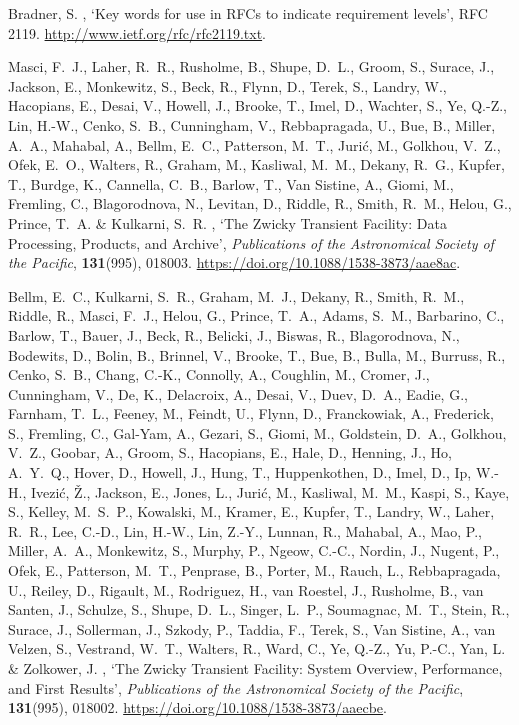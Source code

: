 \begin{thebibliography}{xx}

Bradner, S.  \harvardyearright , `Key words for use in
  {RFCs} to indicate requirement levels', RFC 2119.
\newblock \url{http://www.ietf.org/rfc/rfc2119.txt}.

Masci, F.~J., Laher, R.~R., Rusholme, B., Shupe, D.~L., Groom, S., Surace, J., Jackson, E., Monkewitz, S., Beck, R., Flynn, D., Terek, S., Landry, W., Hacopians, E., Desai, V., Howell, J., Brooke, T., Imel, D., Wachter, S., Ye, Q.-Z., Lin, H.-W., Cenko, S.~B., Cunningham, V., Rebbapragada, U., Bue, B., Miller, A.~A., Mahabal, A., Bellm, E.~C., Patterson, M.~T., Juri\'{c}, M., Golkhou, V.~Z., Ofek, E.~O., Walters, R., Graham, M., Kasliwal, M.~M., Dekany, R.~G., Kupfer, T., Burdge, K., Cannella, C.~B., Barlow, T., Van Sistine, A., Giomi, M., Fremling, C., Blagorodnova, N., Levitan, D., Riddle, R., Smith, R.~M., Helou, G., Prince, T.~A. \& Kulkarni, S.~R. \harvardyearright , `The Zwicky Transient Facility: Data Processing, Products, and Archive', \emph{Publications of the Astronomical Society of the Pacific}, \textbf{131}(995), 018003.
\newblock \url{https://doi.org/10.1088/1538-3873/aae8ac}.

Bellm, E.~C., Kulkarni, S.~R., Graham, M.~J., Dekany, R., Smith, R.~M., Riddle, R., Masci, F.~J., Helou, G., Prince, T.~A., Adams, S.~M., Barbarino, C., Barlow, T., Bauer, J., Beck, R., Belicki, J., Biswas, R., Blagorodnova, N., Bodewits, D., Bolin, B., Brinnel, V., Brooke, T., Bue, B., Bulla, M., Burruss, R., Cenko, S.~B., Chang, C.-K., Connolly, A., Coughlin, M., Cromer, J., Cunningham, V., De, K., Delacroix, A., Desai, V., Duev, D.~A., Eadie, G., Farnham, T.~L., Feeney, M., Feindt, U., Flynn, D., Franckowiak, A., Frederick, S., Fremling, C., Gal-Yam, A., Gezari, S., Giomi, M., Goldstein, D.~A., Golkhou, V.~Z., Goobar, A., Groom, S., Hacopians, E., Hale, D., Henning, J., Ho, A.~Y.~Q., Hover, D., Howell, J., Hung, T., Huppenkothen, D., Imel, D., Ip, W.-H., Ivezi\'{c}, \v{Z}., Jackson, E., Jones, L., Juri\'{c}, M., Kasliwal, M.~M., Kaspi, S., Kaye, S., Kelley, M.~S.~P., Kowalski, M., Kramer, E., Kupfer, T., Landry, W., Laher, R.~R., Lee, C.-D., Lin, H.-W., Lin, Z.-Y., Lunnan, R., Mahabal, A., Mao, P., Miller, A.~A., Monkewitz, S., Murphy, P., Ngeow, C.-C., Nordin, J., Nugent, P., Ofek, E., Patterson, M.~T., Penprase, B., Porter, M., Rauch, L., Rebbapragada, U., Reiley, D., Rigault, M., Rodriguez, H., van Roestel, J., Rusholme, B., van Santen, J., Schulze, S., Shupe, D.~L., Singer, L.~P., Soumagnac, M.~T., Stein, R., Surace, J., Sollerman, J., Szkody, P., Taddia, F., Terek, S., Van Sistine, A., van Velzen, S., Vestrand, W.~T., Walters, R., Ward, C., Ye, Q.-Z., Yu, P.-C., Yan, L. \& Zolkower, J. \harvardyearright , `The Zwicky Transient Facility: System Overview, Performance, and First Results', \emph{Publications of the Astronomical Society of the Pacific}, \textbf{131}(995), 018002.
\newblock \url{https://doi.org/10.1088/1538-3873/aaecbe}.

\end{thebibliography}

